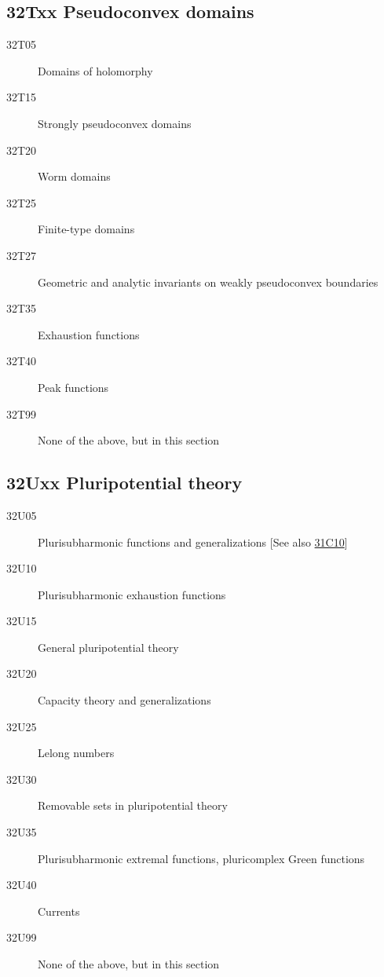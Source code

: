 \documentclass[letterpaper]{article}
\begin{document}
\subsection*{32Txx  Pseudoconvex domains }\label{32Txx}
\begin{description}  
\item [32T05]\label{32T05} Domains of holomorphy
\item [32T15]\label{32T15} Strongly pseudoconvex domains
\item [32T20]\label{32T20} Worm domains
\item [32T25]\label{32T25} Finite-type domains
\item [32T27]\label{32T27} Geometric and analytic invariants on weakly pseudoconvex boundaries
\item [32T35]\label{32T35} Exhaustion functions
\item [32T40]\label{32T40} Peak functions
\item [32T99]\label{32T99} None of the above, but in this section
\end{description}
\subsection*{32Uxx  Pluripotential theory }\label{32Uxx}
\begin{description}  
\item [32U05]\label{32U05} Plurisubharmonic functions and generalizations [See also \hyperref[31C10]{31C10}]
\item [32U10]\label{32U10} Plurisubharmonic exhaustion functions
\item [32U15]\label{32U15} General pluripotential theory
\item [32U20]\label{32U20} Capacity theory and generalizations
\item [32U25]\label{32U25} Lelong numbers
\item [32U30]\label{32U30} Removable sets in pluripotential theory
\item [32U35]\label{32U35} Plurisubharmonic extremal functions, pluricomplex Green functions
\item [32U40]\label{32U40} Currents
\item [32U99]\label{32U99} None of the above, but in this section
\end{description}
\end{document}
